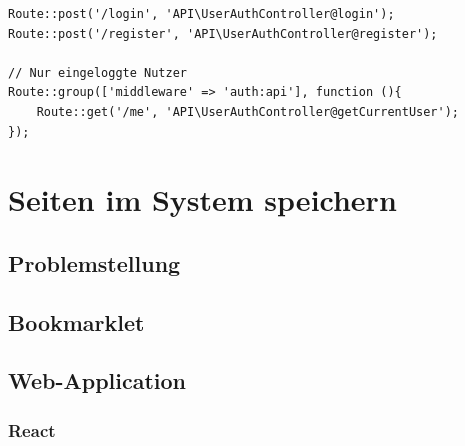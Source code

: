             \begin{lstlisting}
Route::post('/login', 'API\UserAuthController@login');
Route::post('/register', 'API\UserAuthController@register');

// Nur eingeloggte Nutzer
Route::group(['middleware' => 'auth:api'], function (){
    Route::get('/me', 'API\UserAuthController@getCurrentUser');
});
            \end{lstlisting}

\section{Seiten im System speichern}
\subsection{Problemstellung}
\subsection{Bookmarklet}
\subsection{Web-Application}
\subsubsection{React}